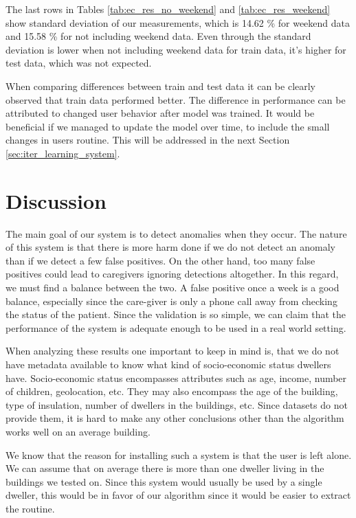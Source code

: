 The last rows in Tables \ref{tab:ec_res_no_weekend} and \ref{tab:ec_res_weekend} show standard deviation of our measurements,
which is 14.62 \% for weekend data and 15.58 \% for not including weekend data.
Even through the standard deviation is lower when not including weekend data for train data, it's higher for test data, which was not expected.

When comparing differences between train and test data it can be clearly observed that train data performed better.
The difference in performance can be attributed to changed user behavior after model was trained.
It would be beneficial if we managed to update the model over time, to include the small changes in users routine.
This will be addressed in the next Section \ref{sec:iter_learning_system}.

\section{Discussion}

The main goal of our system is to detect anomalies when they occur. 
The nature of this system is that there is more harm done if we do not detect an anomaly than if we detect a few false positives. 
On the other hand, too many false positives could lead to caregivers ignoring detections altogether.
In this regard, we must find a balance between the two.
A false positive once a week is a good balance, especially since the care-giver is only a phone call away from checking the status of the patient.
Since the validation is so simple, we can claim that the performance of the system is adequate enough to be used in a real world setting.

When analyzing these results one important to keep in mind is,
that we do not have metadata available to know what kind of socio-economic status dwellers have.
Socio-economic status encompasses attributes such as age, income, number of children, geolocation, etc.
They may also encompass the age of the building, type of insulation, number of dwellers in the buildings, etc.
Since datasets do not provide them, it is hard to make any other conclusions other than the algorithm works well on an average building.

We know that the reason for installing such a system is that the user is left alone.
We can assume that on average there is more than one dweller living in the buildings we tested on.
Since this system would usually be used by a single dweller,
this would be in favor of our algorithm since it would be 
easier to extract the routine.

